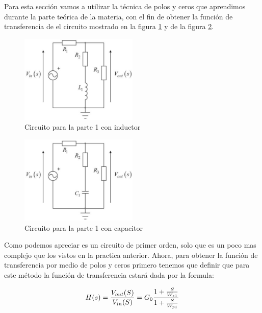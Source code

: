 \documentclass[letterpaper,spanish,12pt]{report}
\begin{document}
Para esta secci\'on vamos a utilizar la t\'ecnica de polos y ceros que aprendimos durante la parte te\'orica de la materia, con el fin de obtener la funci\'on de transferencia de el circuito mostrado en la figura \ref{cir:1} y de la figura \ref{cir:2}.\\ \medskip

\begin{figure}[h]
	\centering
		\includegraphics[width=0.50\textwidth]{Circuito1.eps}
	\caption{Circuito para la parte 1 con inductor}
	\label{cir:1}
\end{figure}

\begin{figure}[h]
	\centering
		\includegraphics[width=0.50\textwidth]{Circuito4.eps}
	\caption{Circuito para la parte 1 con capacitor}
	\label{cir:2}
\end{figure}


Como podemos apreciar es un circuito de primer orden, solo que es un poco mas complejo que los vistos en la practica anterior. Ahora, para obtener la funci\'on de transferencia por medio de polos y ceros primero tenemos que definir que para este m\'etodo la funci\'on de transferencia estar\'a dada por la formula: \\ \medskip

	\begin{equation}
		\centering
		H(s) = \frac {V_{out}(S)} {V_{in}(S)} = G_{0} \frac {1 + \frac {S} {W_{z1}} } {1 + \frac {S} {W_{p1}} }  
		\label{ecu:1}
	\end{equation}
\end{document}

